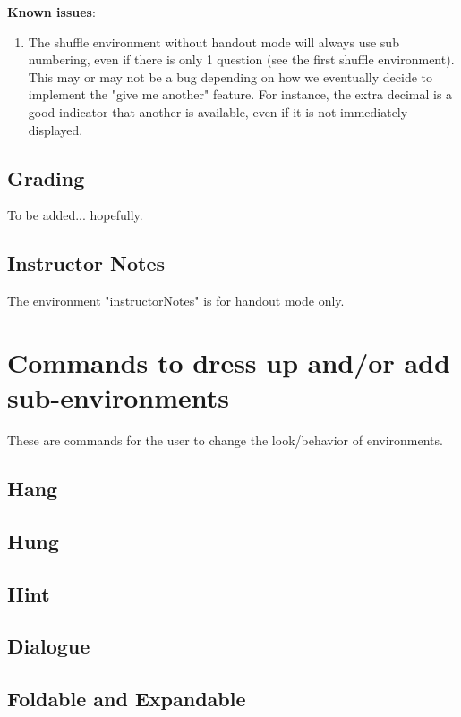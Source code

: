 \documentclass{ximera}
\begin{document}
	\textbf{Known issues}:\\
	\begin{enumerate}
	\item The shuffle environment without handout mode will always use sub numbering, even if there is only 1 question (see the first shuffle environment). This may or may not be a bug depending on how we eventually decide to implement the "give me another" feature. For instance, the extra decimal is a good indicator that another is available, even if it is not immediately displayed.
	\end{enumerate}
	
	
	
	\subsection{Grading}
	To be added... hopefully.
	
	\subsection{Instructor Notes}
	The environment "instructorNotes" is for handout mode only.

\newpage
\section{Commands to dress up and/or add sub-environments}
These are commands for the user to change the look/behavior of environments.

	\subsection{Hang}
	
	\subsection{Hung}
	
	\subsection{Hint}
	
	\subsection{Dialogue}
	
	\subsection{Foldable and Expandable}
	
\end{document}
